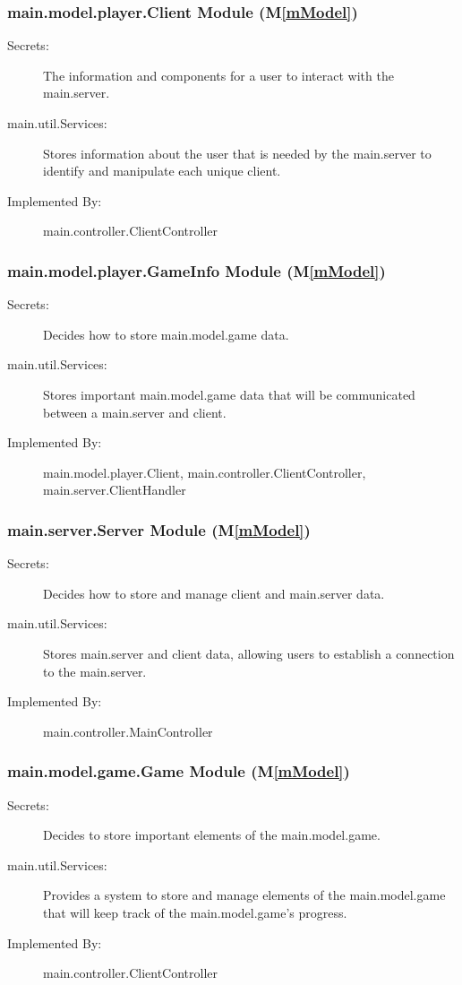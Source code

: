 \documentclass[12pt, titlepage]{article}
\newcommand{\mref}[1]{M\ref{#1}}
\begin{document}
\subsubsection{ main.model.player.Client Module (\mref{mModel})}
    \begin{description}
    \item[Secrets:] The information and components for a user to interact with the main.server.
    \item[main.util.Services:] Stores information about the user that is needed by the main.server to identify and manipulate each unique client.
    \item[Implemented By:] main.controller.ClientController
    \end{description}

\subsubsection{ main.model.player.GameInfo Module (\mref{mModel})}
    \begin{description}
    \item[Secrets:] Decides how to store main.model.game data.
    \item[main.util.Services:] Stores important main.model.game data that will be communicated between a main.server and client.
    \item[Implemented By:] main.model.player.Client, main.controller.ClientController, main.server.ClientHandler
    \end{description}

\subsubsection{ main.server.Server Module (\mref{mModel})}
    \begin{description}
    \item[Secrets:] Decides how to store and manage client and main.server data.
    \item[main.util.Services:] Stores main.server and client data, allowing users to establish a connection to the main.server.
    \item[Implemented By:] main.controller.MainController
    \end{description}

\subsubsection{ main.model.game.Game Module (\mref{mModel})}
    \begin{description}
    \item[Secrets:] Decides to store important elements of the main.model.game.
    \item[main.util.Services:] Provides a system to store and manage elements of the main.model.game that will keep track of the main.model.game's progress.
    \item[Implemented By:] main.controller.ClientController
    \end{description}
\end{document}
